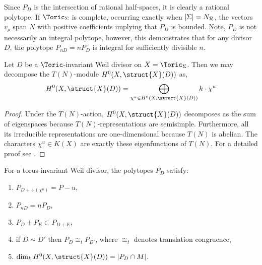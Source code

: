 \begin{rmk}
Since $P_D$ is the intersection of rational half-spaces, it is clearly a rational polytope. If $\Toric_\Sigma$ is complete, occurring exactly when $|\Sigma| = N_{\mathcal{R}}$, the vectors $v_\rho$ span $N$ with positive coefficients implying that $P_D$ is bounded. Note, $P_D$ is not necessarily an integral polytope, however, this demonstrates that for any divisor $D$, the polytope $P_{nD} = n P_D$ is integral for sufficiently divisible $n$. 
\end{rmk}

\begin{thm}
Let $D$ be a $\Toric$-invariant Weil divisor on $X = \Toric_\Sigma$. Then we may decompose the $T(N)$-module $H^0(X, \struct{X}(D))$ as,
\[ H^0(X, \struct{X}(D)) = \bigoplus_{\chi^u \in H^0(X, \struct{X}(D))} k \cdot \chi^u \]
\end{thm}

\begin{proof}
Under the $T(N)$-action, $H^0(X, \struct{X}(D))$  decomposes as the sum of eigenspaces because $T(N)$-representations are semisimple. Furthermore, all its irreducible representations are one-dimensional because $T(N)$ is abelian. The characters $\chi^u \in K(X)$ are exactly these eigenfunctions of $T(N)$. For a detailed proof see \cite[Prop. 4.3.2]{cox}.
\end{proof}

\begin{proposition}
For a torus-invariant Weil divisor, the polytopes $P_D$ satisfy:
\begin{enumerate}
\item $P_{D + \div{(\chi^u)}} = P - u$,
\item $P_{n D} = n P_D$,
\item $P_{D} + P_{E} \subset P_{D + E}$,
\item if $D \sim D'$ then $P_D \cong_t P_{D'}$, where $\cong_t$ denotes translation congruence,
\item $\dim_k H^0(X, \struct{X}(D)) = | P_D \cap M |$.
\end{enumerate}
\end{proposition}

